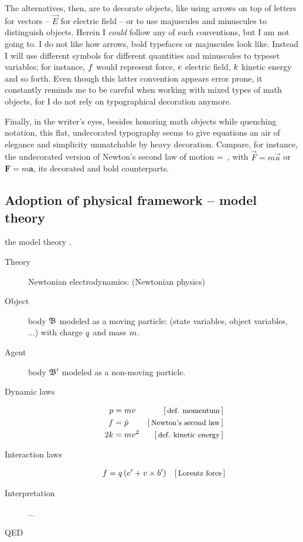The alternatives, then, are to decorate objects, like using arrows on top of letters for vectors -- $\vec E$ for electric field -- or to use majuscules and minuscules to distinguish objects. Herein I \emph{could} follow any of such conventions, but I am not going to. I do not like how arrows, bold typefaces or majuscules look like. Instead I will use different symbols for different quantities and minuscules to typeset variables; for instance, $f$ would represent force, $e$ electric field, $k$ kinetic energy and so forth. Even though this latter convention appears error prone, it constantly reminds me to be careful when working with mixed types of math objects, for I do not rely on typographical decoration anymore.

Finally,
%
%
in the writer's eyes, besides honoring math objects while quenching notation, this flat, undecorated typography seems to give equations an air of elegance and simplicity unmatchable by heavy decoration. Compare, for instance, the undecorated version of Newton's second law of motion 
%
%
\beq
  \force = \mass\acc\,,
\eeq
%
with $\vec F = m\vec a$ or $\mathbf{F} = m\mathbf{a}$, its decorated and bold counterparts.


\subsection{Adoption of physical framework -- model theory}\label{sec:physicalframework}
%
\via the model theory \cite{hestenes:1987}.
%
%
\begin{description}
%
\item[Theory] Newtonian electrodynamics: (Newtonian physics)
%
\item[Object] body $\mathfrak{B}$ modeled as a moving particle: (state variables, object variables, ...) with charge $q$ and mass $m$.
%
\item[Agent] body $\mathfrak{B}'$ modeled as a non-moving particle.
%
\item[Dynamic laws]
%
\begin{align}
  \mom   &= \mass\vel   & \eqtxt{def. momentum} \\
  \force &= \dt\mom     & \eqtxt{Newton's second law} \\
  2\ekin &= \mass\vel^2 & \eqtxt{def. kinetic energy}
\end{align}
%
\item[Interaction laws]
%
\begin{align}
  \force &= \echarge\parth{\efield' + \vel\cprod\mfield'} & \eqtxt{Lorentz force}
\end{align}
%
\item[Interpretation] ...
%
\item[QED]
%
\end{description}

